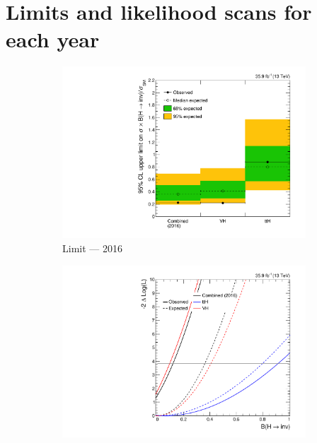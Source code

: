 \clearpage




\section{Limits and likelihood scans for each year}
\label{sec:limits_likelihoods_year_supplementary}

\begin{figure}[htbp]
    \centering
    \begin{subfigure}[t]{0.45\textwidth}  %
        \includegraphics[width=\textwidth]{chapters/higgstoinv/figures/limits/per_year/limit_2016_comb.pdf}
        \caption{Limit --- 2016}
    \end{subfigure}
    \hspace{0.05\textwidth}
    \begin{subfigure}[t]{0.45\textwidth}
        \includegraphics[width=\textwidth]{chapters/higgstoinv/figures/likelihood_scan/profile_likelihood_scan_2016.pdf}

\end{subfigure}
\end{figure}
